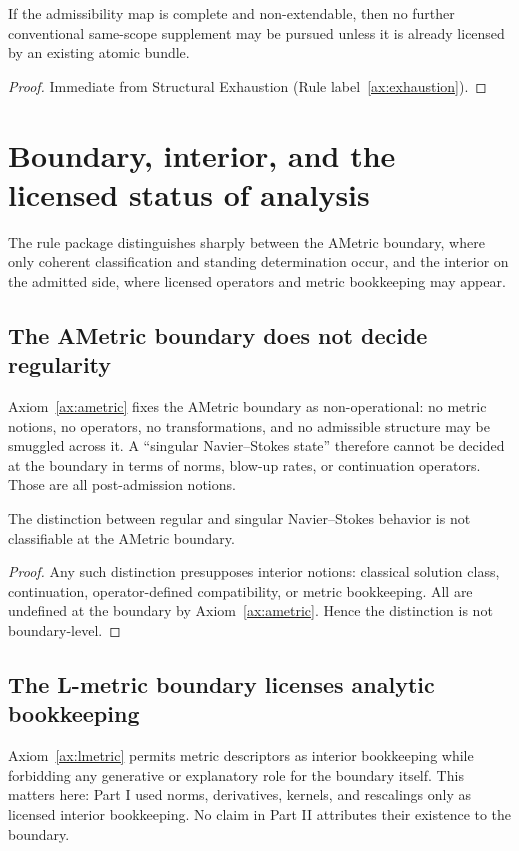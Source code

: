 \begin{corollary}\label{cor:pivot-necessary}
If the admissibility map is complete and non-extendable, then no further conventional same-scope supplement may be
pursued unless it is already licensed by an existing atomic bundle.
\end{corollary}

\begin{proof}
Immediate from Structural Exhaustion (Rule label~\ref{ax:exhaustion}).
\end{proof}

\section{Boundary, interior, and the licensed status of analysis}
The rule package distinguishes sharply between the AMetric boundary, where only coherent classification
and standing determination occur, and the interior on the admitted side, where licensed operators and metric
bookkeeping may appear.

\subsection{The AMetric boundary does not decide regularity}
Axiom~\ref{ax:ametric} fixes the AMetric boundary as non-operational: no metric notions, no operators, no
transformations, and no admissible structure may be smuggled across it.  A
``singular Navier--Stokes state'' therefore cannot be decided at the boundary in terms of norms,
blow-up rates, or continuation operators. Those are all post-admission notions.

\begin{lemma}\label{lem:boundary-not-enough}
The distinction between regular and singular Navier--Stokes behavior is not classifiable at the
AMetric boundary.
\end{lemma}

\begin{proof}
Any such distinction presupposes interior notions: classical solution class, continuation,
operator-defined compatibility, or metric bookkeeping. All are undefined at the boundary by Axiom~\ref{ax:ametric}.
Hence the distinction is not boundary-level. 
\end{proof}

\subsection{The L-metric boundary licenses analytic bookkeeping}
Axiom~\ref{ax:lmetric} permits metric descriptors as interior bookkeeping while forbidding
any generative or explanatory role for the boundary itself.  This matters here:
Part I used norms, derivatives, kernels, and rescalings only as licensed interior bookkeeping. No
claim in Part II attributes their existence to the boundary.

